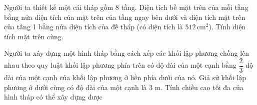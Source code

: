 \begin{bt}%

Người ta thiết kế một cái tháp gồm 8 tầng. Diện tích bề mặt trên của mỗi tầng bằng nửa diện tích của mặt trên của tầng ngay bên dưới và diện tích mặt trên của tầng 1 bằng nửa diện tích của đế tháp (có diện tích là $512\, \mathrm{cm}^2$). Tính diện tích mặt trên cùng.
\end{bt}

\begin{bt}%

	Người ta xây dựng một hình tháp bằng cách xếp các khối lập phương chồng lên nhau theo quy luật khối lập phương phía trên có độ dài của một cạnh bằng $\dfrac{2}{3}$ độ dài của một cạnh của khối lập phương ở liền phía dưới của nó. Giả sử khối lập phương ở dưới cùng có độ dài của một cạnh là $3$ m. Tính chiều cao tối đa của hình tháp có thể xây dựng được
\end{bt}


